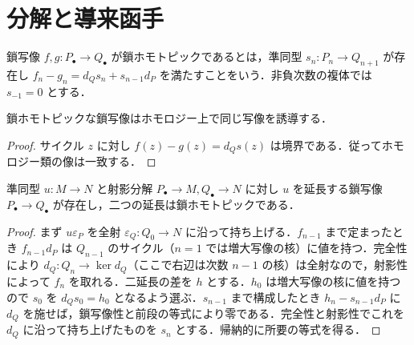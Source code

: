 \section{分解と導来函手}
\begin{defn}[鎖ホモトピー]
鎖写像 $f,g:P_\bullet\to Q_\bullet$ が鎖ホモトピックであるとは，準同型 $s_n:P_n\to Q_{n+1}$ が存在し $f_n-g_n=d_Qs_n+s_{n-1}d_P$ を満たすことをいう．非負次数の複体では $s_{-1}=0$ とする．
\end{defn}
\begin{prop}[鎖ホモトピー不変性]
鎖ホモトピックな鎖写像はホモロジー上で同じ写像を誘導する．
\end{prop}
\begin{proof}
サイクル $z$ に対し $f(z)-g(z)=d_Qs(z)$ は境界である．従ってホモロジー類の像は一致する．
\end{proof}
\begin{prop}[射影分解の比較定理]
準同型 $u:M\to N$ と射影分解 $P_\bullet\to M,Q_\bullet\to N$ に対し $u$ を延長する鎖写像 $P_\bullet\to Q_\bullet$ が存在し，二つの延長は鎖ホモトピックである．
\end{prop}
\begin{proof}
まず $u\varepsilon_P$ を全射 $\varepsilon_Q:Q_0\to N$ に沿って持ち上げる．$f_{n-1}$ まで定まったとき $f_{n-1}d_P$ は $Q_{n-1}$ のサイクル（$n=1$ では増大写像の核）に値を持つ．完全性により $d_Q:Q_n\to\ker d_Q$（ここで右辺は次数 $n-1$ の核）は全射なので，射影性によって $f_n$ を取れる．二延長の差を $h$ とする．$h_0$ は増大写像の核に値を持つので $s_0$ を $d_Qs_0=h_0$ となるよう選ぶ．$s_{n-1}$ まで構成したとき $h_n-s_{n-1}d_P$ に $d_Q$ を施せば，鎖写像性と前段の等式により零である．完全性と射影性でこれを $d_Q$ に沿って持ち上げたものを $s_n$ とする．帰納的に所要の等式を得る．
\end{proof}
